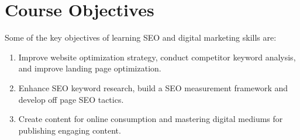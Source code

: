 
\section{Course Objectives}
Some of the key objectives of learning SEO and digital marketing skills are:
\begin{enumerate}
  \item Improve website optimization strategy, conduct competitor keyword analysis, and improve landing page optimization.
  
  \item Enhance SEO keyword research, build a SEO measurement framework and develop off page SEO tactics.
  
  \item Create content for online consumption and mastering digital mediums for publishing engaging content.
\end{enumerate}